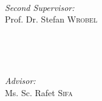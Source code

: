 \begin{titlepage}
\begin{minipage}{0.3\textwidth}
  \begin{flushleft} \large
  \end{flushleft}
\end{minipage}
~
\begin{minipage}{0.6\textwidth}
  \begin{flushright} \large
  \emph{Second Supervisor:} \\
  Prof. Dr. Stefan \textsc{Wrobel} %

  \end{flushright}
\end{minipage}\\[0.5cm]

\begin{minipage}{0.3\textwidth}
  \begin{flushleft} \large
  \end{flushleft}
\end{minipage}
~
\begin{minipage}{0.6\textwidth}
  \begin{flushright} \large
  \emph{Advisor:} \\
  Ms. Sc. Rafet \textsc{Sifa} %

  \end{flushright}
\end{minipage}\\[7cm]



{\large {}}\\[3cm] %




\vfill %

\end{titlepage}
